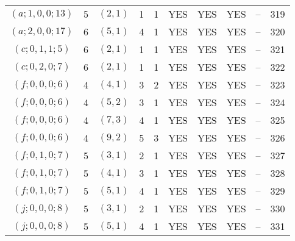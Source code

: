 \begin{longtable}{|c|c|c|c|c|c|c|c|c|c|}
$(a; 1, 0, 0; 13)$ & 5 & $(2, 1)$ & 1 & 1 & YES & YES & YES & -- & 319\\
$(a; 2, 0, 0; 17)$ & 6 & $(5, 1)$ & 4 & 1 & YES & YES & YES & -- & 320\\
$(c; 0, 1, 1; 5)$ & 6 & $(2, 1)$ & 1 & 1 & YES & YES & YES & -- & 321\\
$(c; 0, 2, 0; 7)$ & 6 & $(2, 1)$ & 1 & 1 & YES & YES & YES & -- & 322\\
$(f; 0, 0, 0; 6)$ & 4 & $(4, 1)$ & 3 & 2 & YES & YES & YES & -- & 323\\
$(f; 0, 0, 0; 6)$ & 4 & $(5, 2)$ & 3 & 1 & YES & YES & YES & -- & 324\\
$(f; 0, 0, 0; 6)$ & 4 & $(7, 3)$ & 4 & 1 & YES & YES & YES & -- & 325\\
$(f; 0, 0, 0; 6)$ & 4 & $(9, 2)$ & 5 & 3 & YES & YES & YES & -- & 326\\
$(f; 0, 1, 0; 7)$ & 5 & $(3, 1)$ & 2 & 1 & YES & YES & YES & -- & 327\\
$(f; 0, 1, 0; 7)$ & 5 & $(4, 1)$ & 3 & 1 & YES & YES & YES & -- & 328\\
$(f; 0, 1, 0; 7)$ & 5 & $(5, 1)$ & 4 & 1 & YES & YES & YES & -- & 329\\
$(j; 0, 0, 0; 8)$ & 5 & $(3, 1)$ & 2 & 1 & YES & YES & YES & -- & 330\\
$(j; 0, 0, 0; 8)$ & 5 & $(5, 1)$ & 4 & 1 & YES & YES & YES & -- & 331
\end{longtable}
